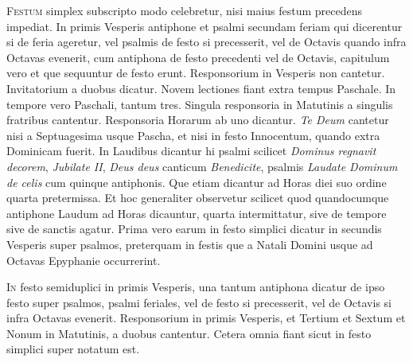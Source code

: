 \begin{multicols*}{2}
{\color{Red} }
\lettrine[lines=2]{\zallmancaps \color{Red} F}{estum} simplex subscripto modo celebretur, nisi maius festum precedens impediat. In primis Vesperis antiphone et psalmi secundam feriam qui dicerentur si de feria ageretur, vel psalmis de festo si precesserit, vel de Octavis quando infra Octavas evenerit, cum antiphona de festo precedenti vel de Octavis, capitulum vero et que sequuntur de festo erunt. Responsorium in Vesperis non cantetur. Invitatorium a duobus dicatur. Novem lectiones fiant extra tempus Paschale. In tempore vero Paschali, tantum tres. Singula responsoria in Matutinis a singulis fratribus cantentur. Responsoria Horarum ab uno dicantur. \textit{Te Deum} cantetur nisi a Septuagesima usque Pascha, et nisi in festo Innocentum, quando extra Dominicam fuerit. In Laudibus dicantur hi psalmi scilicet \textit{Dominus regnavit decorem}, \textit{Jubilate II}, \textit{Deus deus} canticum \textit{Benedicite}, psalmis \textit{Laudate Dominum de celis} cum quinque antiphonis. Que etiam dicantur ad Horas diei suo ordine quarta pretermissa. Et hoc generaliter observetur scilicet quod quandocumque antiphone Laudum ad Horas dicauntur, quarta intermittatur, sive de tempore sive de sanctis agatur.
Prima vero earum in festo simplici dicatur in secundis Vesperis super psalmos, preterquam in festis que a Natali Domini usque ad Octavas Epyphanie occurrerint.

{\color{Red} }
\lettrine[lines=2]{\zallmancaps \color{Blue} I}{n} festo semiduplici in primis Vesperis, una tantum antiphona dicatur de ipso festo super psalmos, psalmi feriales, vel de festo si precesserit, vel de Octavis si infra Octavas evenerit.
Responsorium in primis Vesperis, et Tertium et Sextum et Nonum in Matutinis, a duobus cantentur. Cetera omnia fiant sicut in festo simplici super notatum est.


\end{multicols*}

